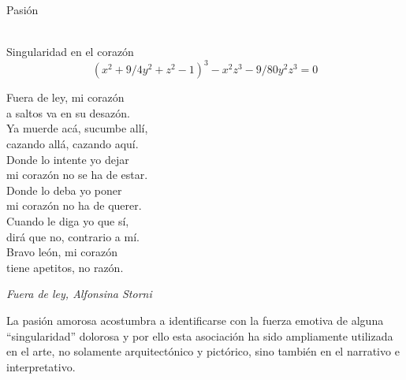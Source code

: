 \documentclass[es]{SurferDesc}%
\begin{document}
\footnotesize

\begin{surferPage}
  \begin{surferTitle}Pasi\'on\end{surferTitle}   \\
Singularidad en el coraz\'on\\
\smallskip
\[(x^2+ 9/4y^2	+ z^2- 1)^3- x^2z^3	- 9/80y^2z^3	= 0\]

\singlespacing
Fuera de ley, mi coraz\'on\\a saltos va en su desaz\'on.\\
\vspace{0.3cm}
Ya muerde ac\'a, sucumbe all\'i,\\cazando all\'a, cazando aqu\'i.\\
\vspace{0.3cm}
Donde lo intente yo dejar\\mi coraz\'on no se ha de estar.\\
\vspace{0.3cm}
Donde lo deba yo poner\\mi coraz\'on no ha de querer.\\
\vspace{0.3cm}
Cuando le diga yo que s\'i,\\dir\'a que no, contrario a m\'i.\\
\vspace{0.3cm}
Bravo le\'on, mi coraz\'on\\tiene apetitos, no raz\'on.

\begin{flushright}
{\it Fuera de ley, Alfonsina Storni}
\end{flushright}

\singlespacing 
La pasi\'on amorosa acostumbra a identificarse con la fuerza emotiva de alguna ``singularidad'' dolorosa y por ello esta asociaci\'on ha sido ampliamente utilizada en el arte, no solamente arquitect\'onico y pict\'orico, sino tambi\'en en el narrativo e interpretativo. 

  \begin{surferText}
     \end{surferText}
\end{surferPage}
\end{document}

